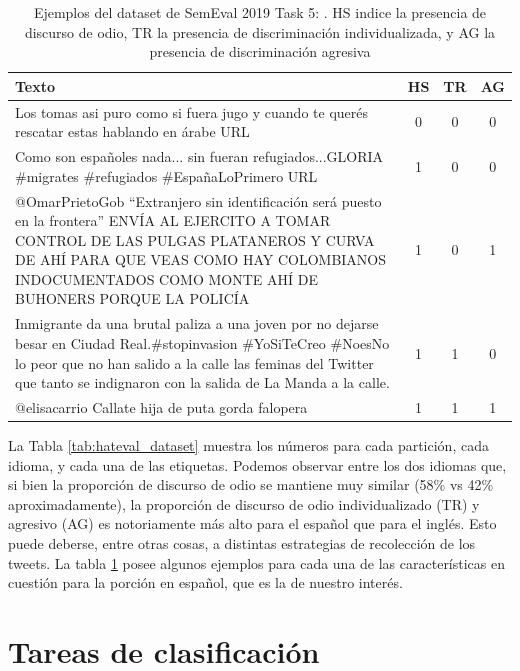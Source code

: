 \begin{table}
    \centering
    \small
    \begin{tabularx}{\textwidth}{X c c c}
        Texto & HS & TR & AG \\
        \hline
        Los tomas asi puro como si fuera jugo y cuando te querés rescatar estas hablando en árabe URL & 0 & 0 & 0 \\
        \rule{0pt}{4ex}Como son españoles nada... sin fueran refugiados...GLORIA \#migrates \#refugiados \#EspañaLoPrimero URL & 1 & 0 & 0 \\
        \rule{0pt}{4ex}@OmarPrietoGob ``Extranjero sin identificación será puesto en la frontera'' ENVÍA AL EJERCITO A TOMAR CONTROL DE LAS PULGAS PLATANEROS Y CURVA DE AHÍ PARA QUE VEAS COMO HAY COLOMBIANOS INDOCUMENTADOS COMO MONTE AHÍ DE BUHONERS PORQUE LA POLICÍA & 1 & 0 & 1 \\
        \rule{0pt}{4ex}Inmigrante da una brutal paliza a una joven por no dejarse besar en Ciudad Real.\#stopinvasion \#YoSiTeCreo \#NoesNo lo peor que no han salido a la calle las feminas del Twitter que tanto se indignaron con la salida de La Manda a la calle. & 1 & 1 & 0 \\
        \rule{0pt}{4ex}@elisacarrio Callate hija de puta gorda falopera & 1 & 1 & 1 \\
        \hline
    \end{tabularx}
    \caption{Ejemplos del dataset de SemEval 2019 Task 5: \hateval{}. HS indice la presencia de discurso de odio, TR la presencia de discriminación individualizada, y AG la presencia de discriminación agresiva}
    \label{tab:hateval_dataset_examples}
\end{table}



La Tabla \ref{tab:hateval_dataset} muestra los números para cada partición, cada idioma, y cada una de las etiquetas. Podemos observar entre los dos idiomas que, si bien la proporción de discurso de odio se mantiene muy similar (58\% vs 42\% aproximadamente), la proporción de discurso de odio individualizado (TR) y agresivo (AG) es notoriamente más alto para el español que para el inglés. Esto puede deberse, entre otras cosas, a distintas estrategias de recolección de los tweets. La tabla \ref{tab:hateval_dataset_examples} posee algunos ejemplos para cada una de las características en cuestión para la porción en español, que es la de nuestro interés.

\section{Tareas de clasificación}

